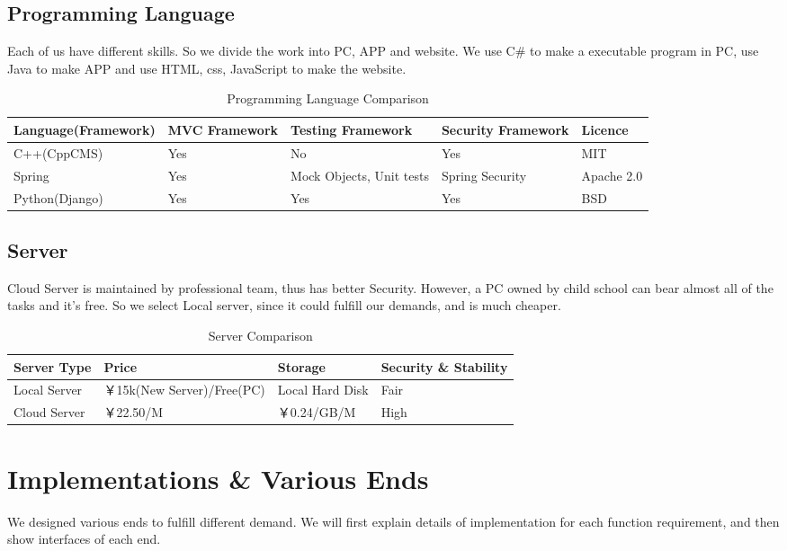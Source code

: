 \documentclass{article}
\begin{document}
\subsection{Programming Language}
Each of us have different skills. So we divide the work into PC, APP and website. We use C\# to make a executable program in PC, use Java to make APP and use HTML, css, JavaScript to make the website.

\begin{table}[htbp]
\centering
  \begin{tabular}{|l|p{2cm}|p{2cm}|p{2cm}|p{2cm}|}
  \hline
   Language(Framework) & MVC Framework & Testing Framework & Security Framework & Licence\\
    \hline
   C++(CppCMS) & Yes & No & Yes & MIT\\
    \hline

   Spring & Yes & Mock Objects, Unit tests & Spring Security & Apache 2.0\\
       \hline

   Python(Django) & Yes & Yes & Yes & BSD \\   
	\hline
     \end{tabular}
  \caption{Programming Language Comparison}
\end{table}

\subsection{Server}
Cloud Server is maintained by professional team, thus has better Security. However, a PC owned by child school can bear almost all of the tasks and it's free. So we select Local server, since it could fulfill our demands, and is much cheaper.

\begin{table}[htbp]
\centering
\begin{tabular}{|l|l|l|l|}
	\hline
	Server Type & Price & Storage & Security \& Stability \\
	\hline
	Local Server & ￥15k(New Server)/Free(PC) & Local Hard Disk & Fair \\
	\hline
	Cloud Server & ￥22.50/M & ￥0.24/GB/M & High \\
	\hline
	
\end{tabular}
	\caption{Server Comparison}
\end{table}

\section{Implementations \& Various Ends}
We designed various ends to fulfill different demand. We will first explain details of implementation for each function requirement, and then show interfaces of each end.
\end{document}
